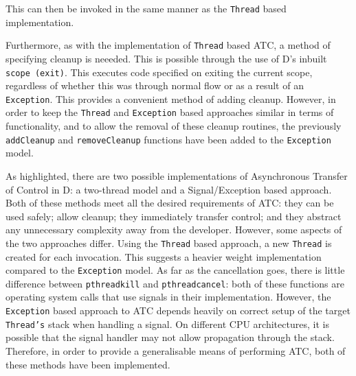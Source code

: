 This can then be invoked in the same manner as the \texttt{Thread} based
implementation.
\par\bigskip\noindent
Furthermore, as with the implementation of \texttt{Thread} based ATC, a method 
of specifying cleanup is neeeded. This
is possible through the use of D's inbuilt \texttt{scope (exit)}.
This executes code specified on exiting the current scope, regardless of
whether this was through normal flow or as a result of an \texttt{Exception}. 
This provides a convenient method of adding cleanup. 
However, in order to keep the \texttt{Thread} and
\texttt{Exception} based approaches similar in terms of functionality, and to
allow the removal of these cleanup routines, the 
previously \texttt{addCleanup} and \texttt{removeCleanup} functions have
been added to the \texttt{Exception} model. 
\par\bigskip\noindent
As highlighted, there are two possible implementations of Asynchronous
Transfer of Control in D: a two-thread model and a Signal/Exception based
approach. Both of these methods meet all the desired requirements of ATC: 
they can be used safely; allow cleanup; they immediately transfer control; and
they abstract any unnecessary complexity away from the developer. 
However, some aspects of the two approaches differ. 
Using the \texttt{Thread} based approach, a new \texttt{Thread} is
created for each invocation. This suggests a heavier weight implementation compared
to the \texttt{Exception} model.
As far as the cancellation goes, there is little difference between
\texttt{pthread\textunderscore{}kill} and
\texttt{pthread\textunderscore{}cancel}:
both of these functions are operating system calls that use signals in their
implementation. 
However, the \texttt{Exception} based approach to ATC depends heavily on correct 
setup of the target \texttt{Thread's} stack when handling a signal. 
On different CPU architectures, it is possible that the signal handler may not 
allow propagation through the stack.
Therefore, in order to provide a generalisable means of performing ATC, both of
these methods have been implemented. 

